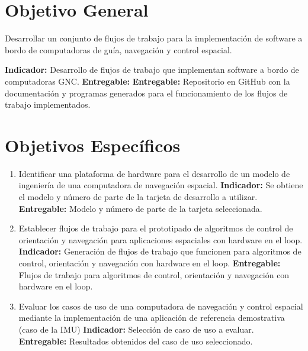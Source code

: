 \documentclass[12pt]{article}
\begin{document}
\section{Objetivo General}

Desarrollar un conjunto de flujos de trabajo para la implementación de software a bordo de computadoras de guía, navegación y control espacial.

\textbf{Indicador:} Desarrollo de flujos de trabajo que implementan software a bordo de computadoras GNC.\newline
\textbf{Entregable:} \textbf{Entregable:} Repositorio en GitHub con la documentación y programas generados para el funcionamiento de los flujos de trabajo implementados.

\section{Objetivos Específicos}

\begin{enumerate}
  \item Identificar una plataforma de hardware para el desarrollo de un modelo de ingeniería de una computadora de navegación espacial. \newline
        \textbf{Indicador:} Se obtiene el modelo y número de parte de la tarjeta de desarrollo a utilizar.\newline
        \textbf{Entregable:} Modelo y número de parte de la tarjeta seleccionada.
  \item Establecer flujos de trabajo para el prototipado de algoritmos de control de orientación y navegación para aplicaciones espaciales con hardware en el loop. \newline
        \textbf{Indicador:} Generación de flujos de trabajo que funcionen para algoritmos de control, orientación y navegación con hardware en el loop.\newline
        \textbf{Entregable:} Flujos de trabajo para algoritmos de control, orientación y navegación con hardware en el loop.
  \item Evaluar los casos de uso de una computadora de navegación y control espacial mediante la implementación de una aplicación de referencia demostrativa (caso de la IMU) \newline
        \textbf{Indicador:} Selección de caso de uso a evaluar.\newline
        \textbf{Entregable:} Resultados obtenidos del caso de uso seleccionado.
\end{enumerate}
\end{document}
